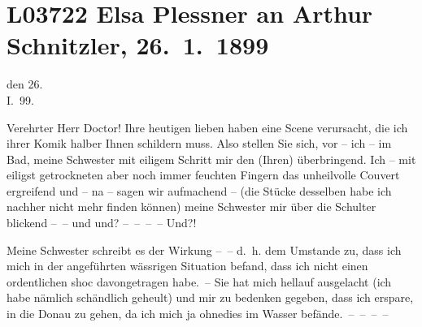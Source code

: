 

\section[Elsa Plessner an Arthur Schnitzler, 26. 1. 1899]{L03722 Elsa Plessner an Arthur Schnitzler, 26. 1. 1899}
\nopagebreak{}
\rehead{ }\normalsize\beginnumbering{}
\toendnotes[C]{\smallbreak\pagebreak[2]}
\toendnotes[C]{\smallbreak}
\pstart
           \centering{}{\pb}den 26.{\\}I. 99.\pend
           
\pstart\center{}Verehrter Herr Doctor!\pend\vspace{0.5em}
\pstart
           Ihre heutigen lieben \label{K_L03722-1v}\label{K_L03722-1} haben eine Scene
               verursacht, die ich ihrer Komik halber Ihnen schildern muss. Also stellen Sie sich,
               vor – ich – im Bad, meine Schwester mit eiligem Schritt mir den \introOben{}(Ihren)\introOben{}{ }\label{K_L03722-2v}\label{K_L03722-2} überbringend. Ich – mit eiligst
               getrockneten aber noch immer feuchten Fingern das
               unheilvolle Couvert ergreifend und – na – sagen wir aufmachend – (die Stücke
               desselben habe ich nachher nicht mehr finden können) meine Schwester mir über die Schulter blickend
               – – und {\pb}und? – – – – Und?!{\dotstwo}\pend
           
\pstart
           Meine Schwester schreibt es
               der Wirkung – – d. h. dem Umstande zu, dass ich mich in der angeführten wässrigen
               Situation befand, dass ich nicht einen ordentlichen shoc davongetragen habe. – Sie
               hat mich hellauf ausgelacht (ich habe nämlich schändlich geheult) und mir zu bedenken
               gegeben, dass ich erspare, in die Donau zu
               gehen, da ich mich ja ohnedies im Wasser befände. – – – –\pend
           
